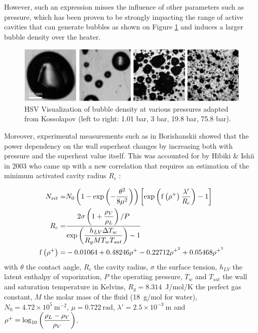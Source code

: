 However, such an expression misses the influence of other parameters such as pressure, which has been proven to be strongly impacting the range of active cavities that can generate bubbles as shown on Figure \ref{fig:nsd_P_koss} and induces a larger bubble density over the heater. 

\begin{figure}[h!]
\centering
\includegraphics[width=0.7\linewidth]{img/NSD/nsd_press_koss.png}
\caption{HSV Visualization of bubble density at various pressures adapted from Kossolapov \cite{kossolapov_experimental_2021} (left to right: 1.01 bar, 3 bar, 19.8 bar, 75.8 bar). }
\label{fig:nsd_P_koss}
\end{figure}

\npar

Moreover, experimental measurements such as in Borishanskii \cite{borishanskii_heat_1969} showed that the power dependency on the wall superheat changes by increasing both with pressure and the superheat value itself. This was accounted for by Hibiki \& Ishii in 2003 \cite{hibiki_active_2003} who came up with a new correlation that requires an estimation of the minimum activated cavity radius $R_{c}$ : 


\begin{align}
N_{sit} =& N_{0}\parth{1-\exp{-\dfrac{\theta^{2}}{8\mu^{2}} } }\crocht{\exp{ \mathrm{f}\parth{\rho^{+}}\dfrac{\lambda '}{R_{c}} } -1}
\label{eq:nsit_hibiki} \\
%
R_{c} =& \dfrac{2\sigma\parth{1+\dfrac{\rho_{V}}{\rho_{L}}} / P }{\exp{\dfrac{h_{LV} \Delta T_{w}}{R_{g} M T_{w}T_{sat}} } -1}\\
%
\mathrm{f}\parth{\rho^{+}} =& -0.01064 + 0.48246\rho^{+} - 0.22712 \rho^{+^{2}} + 0.05468 \rho^{+^{3}}
\end{align}
with $\theta$ the contact angle, $R_{c}$ the cavity radius, $\sigma$ the surface tension, $h_{LV}$ the latent enthalpy of vaporization, $P$ the operating pressure, $T_{w}$ and $T_{sat}$ the wall and saturation temperature in Kelvins, $R_{g}=8.314$~J/mol/K the perfect gas constant, $M$ the molar mass of the fluid (18~g/mol for water),  $N_{0}=4.72\times 10^{5}\ \mathrm{m}^{-2}$, $\mu = 0.722\ \mathrm{rad}$, $\lambda ' = 2.5 \times 10^{-3} \ \mathrm{m}$ and $\rho^{+}=\mathrm{log}_{10}\left( \dfrac{\rho_{L}-\rho_{V}}{\rho_{V}} \right)$.


